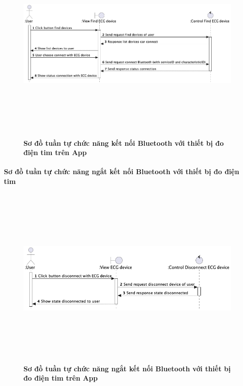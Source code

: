   \begin{figure}[H]
        \centering
        \includegraphics[width=16cm,height=10cm]{Images/mobile_app/connect_with_device.png}
        \caption[Sơ đồ tuần tự chức năng kết nối Bluetooth với thiết bị đo điện tim trên App]{\bfseries \fontsize{12pt}{0pt}
        \selectfont Sơ đồ tuần tự chức năng kết nối Bluetooth với thiết bị đo điện tim trên App}
        \label{hinh21} %
  \end{figure}



\paragraph{Sơ đồ tuần tự chức năng ngắt kết nối Bluetooth với thiết bị đo điện tim}
\mbox{}

  \begin{figure}[H]
        \centering
        \includegraphics[width=16cm,height=9cm]{Images/mobile_app/disconnect_with_device.png}
        \caption[Sơ đồ tuần tự chức năng ngắt kết nối Bluetooth với thiết bị đo điện tim trên App]{\bfseries \fontsize{12pt}{0pt}
        \selectfont Sơ đồ tuần tự chức năng ngắt kết nối Bluetooth với thiết bị đo điện tim trên App}
        \label{hinh21} %
  \end{figure}


